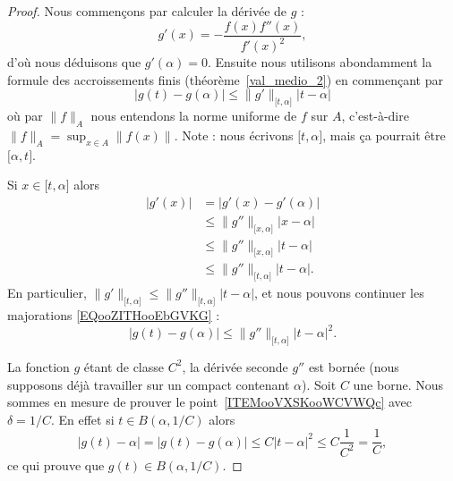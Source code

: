 \begin{proof}
    Nous commençons par calculer la dérivée de \( g\) :
    \begin{equation}
        g'(x)=-\frac{ f(x)f''(x) }{ f'(x)^2 },
    \end{equation}
    d'où nous déduisons que \( g'(\alpha)=0\). Ensuite nous utilisons abondamment la formule des accroissements finis (théorème~\ref{val_medio_2}) en commençant par
    \begin{equation}        \label{EQooZITHooEbGVKG}
        | g(t)-g(\alpha) |\leq \| g' \|_{\mathopen[ t , \alpha \mathclose]}| t-\alpha |
    \end{equation}
    où par \( \| f \|_A\) nous entendons la norme uniforme de \( f\) sur \( A\), c'est-à-dire \( \| f \|_A=\sup_{x\in A}\| f(x) \|\). Note : nous écrivons \( \mathopen[ t , \alpha \mathclose]\), mais ça pourrait être \( \mathopen[ \alpha , t \mathclose]\).

    Si \( x\in\mathopen[ t , \alpha \mathclose]\) alors
    \begin{subequations}
        \begin{align}
            | g'(x) |&=| g'(x)-g'(\alpha) |\\
            &\leq \| g'' \|_{\mathopen[ x , \alpha \mathclose]}| x-\alpha |\\
            &\leq \| g'' \|_{\mathopen[ x , \alpha \mathclose]}| t-\alpha |\\
            &\leq \| g'' \|_{\mathopen[ t , \alpha \mathclose]}| t-\alpha |.
        \end{align}
    \end{subequations}
    En particulier, \( \| g' \|_{\mathopen[ t , \alpha \mathclose]}\leq \| g'' \|_{\mathopen[ t , \alpha \mathclose]}| t-\alpha |\), et nous pouvons continuer les majorations \eqref{EQooZITHooEbGVKG} :
    \begin{equation}
        | g(t)-g(\alpha) |\leq \| g'' \|_{\mathopen[ t , \alpha \mathclose]}| t-\alpha |^2.
    \end{equation}

    La fonction \( g\) étant de classe \( C^2\), la dérivée seconde \( g''\) est bornée (nous supposons déjà travailler sur un compact contenant \( \alpha\)). Soit \( C\) une borne. Nous sommes en mesure de prouver le point~\ref{ITEMooVXSKooWCVWQc} avec \( \delta=1/C\). En effet si \( t\in B(\alpha,1/C)\) alors
    \begin{equation}
        | g(t)-\alpha |=| g(t)-g(\alpha) |\leq C| t-\alpha |^2\leq C\frac{1}{ C^2 }=\frac{1}{ C },
    \end{equation}
    ce qui prouve que \( g(t)\in B(\alpha,1/C)\).


\end{proof}

